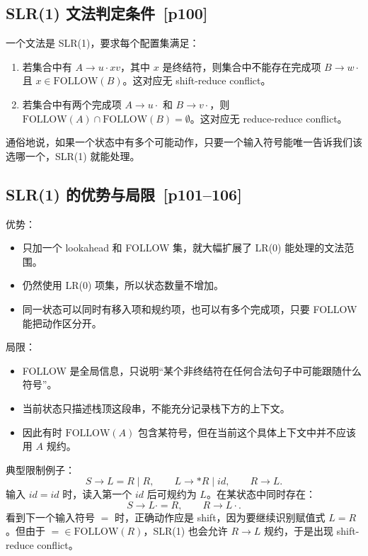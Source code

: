 \documentclass[UTF8,fontset=none,11pt]{ctexart}
\newcommand{\pg}[1]{\texorpdfstring{{\small\color{graytext}\,[p#1]}}{ [p#1]}}
\newcommand{\FOLLOW}{\ensuremath{\mathrm{FOLLOW}}}
\begin{document}
\subsection{SLR(1) 文法判定条件 \pg{100}}

一个文法是 SLR(1)，要求每个配置集满足：

\begin{enumerate}
  \item 若集合中有 \(A\to u\cdot xv\)，其中 \(x\) 是终结符，则集合中不能存在完成项 \(B\to w\cdot\) 且 \(x\in\FOLLOW(B)\)。这对应无 shift-reduce conflict。
  \item 若集合中有两个完成项 \(A\to u\cdot\) 和 \(B\to v\cdot\)，则 \(\FOLLOW(A)\cap\FOLLOW(B)=\emptyset\)。这对应无 reduce-reduce conflict。
\end{enumerate}

通俗地说，如果一个状态中有多个可能动作，只要一个输入符号能唯一告诉我们该选哪一个，SLR(1) 就能处理。

\subsection{SLR(1) 的优势与局限 \pg{101--106}}

优势：

\begin{itemize}
  \item 只加一个 lookahead 和 FOLLOW 集，就大幅扩展了 LR(0) 能处理的文法范围。
  \item 仍然使用 LR(0) 项集，所以状态数量不增加。
  \item 同一状态可以同时有移入项和规约项，也可以有多个完成项，只要 FOLLOW 能把动作区分开。
\end{itemize}

局限：

\begin{itemize}
  \item FOLLOW 是全局信息，只说明“某个非终结符在任何合法句子中可能跟随什么符号”。
  \item 当前状态只描述栈顶这段串，不能充分记录栈下方的上下文。
  \item 因此有时 \(\FOLLOW(A)\) 包含某符号，但在当前这个具体上下文中并不应该用 \(A\) 规约。
\end{itemize}

典型限制例子：
\[
S\to L=R\mid R,\qquad L\to *R\mid id,\qquad R\to L.
\]
输入 \(id=id\) 时，读入第一个 \(id\) 后可规约为 \(L\)。在某状态中同时存在：
\[
S\to L\cdot =R,\qquad R\to L\cdot.
\]
看到下一个输入符号 \(=\) 时，正确动作应是 shift，因为要继续识别赋值式 \(L=R\)。但由于 \(=\in\FOLLOW(R)\)，SLR(1) 也会允许 \(R\to L\) 规约，于是出现 shift-reduce conflict。
\end{document}
